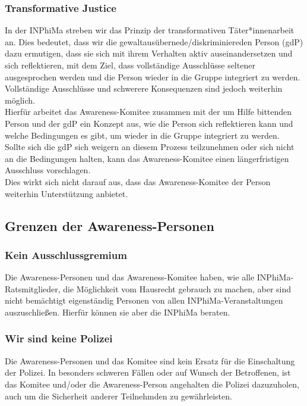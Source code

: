 \documentclass{article}
\begin{document}
\subsubsection{Transformative Justice}

In der INPhiMa streben wir das Prinzip der transformativen Täter*innenarbeit an.
Dies bedeutet, dass wir die gewaltausübernede/diskriminiereden Person (gdP) dazu ermutigen, 
dass sie sich mit ihrem Verhalten aktiv auseinandersetzen und sich reflektieren,
mit dem Ziel, dass vollständige Ausschlüsse seltener ausgesprochen werden und die Person wieder in die Gruppe integriert zu werden.\\
Vollständige Ausschlüsse und schwerere Konsequenzen sind jedoch weiterhin möglich.\\

Hierfür arbeitet das Awareness-Komitee zusammen mit der um Hilfe bittenden Person
und der gdP ein Konzept aus, wie die Person sich
reflektieren kann und welche Bedingungen es gibt, um wieder in die Gruppe integriert zu werden.\\

Sollte sich die gdP sich weigern an diesem Prozess teilzunehmen oder sich nicht an die Bedingungen halten,
kann das Awareness-Komitee einen längerfristigen Ausschluss vorschlagen.\\
Dies wirkt sich nicht darauf aus, dass das Awareness-Komitee der Person weiterhin Unterstützung anbietet.\\

\subsection{Grenzen der Awareness-Personen}

\subsubsection{Kein Ausschlussgremium}
Die Awareness-Personen und das Awareness-Komitee haben, wie alle INPhiMa-Ratsmitglieder, die Möglichkeit vom Hausrecht gebrauch zu machen, aber sind nicht bemächtigt eigenständig Personen von allen INPhiMa-Veranstaltungen auszuschließen. Hierfür können sie aber die INPhiMa beraten.

\subsubsection{Wir sind keine Polizei}
Die Awareness-Personen und das Komitee sind kein Ersatz für die Einschaltung der Polizei. In besonders schweren Fällen oder auf Wunsch der Betroffenen, ist das Komitee und/oder die Awareness-Person angehalten die Polizei dazuzuholen, auch um die Sicherheit anderer Teilnehmden zu gewährleisten.
\end{document}
